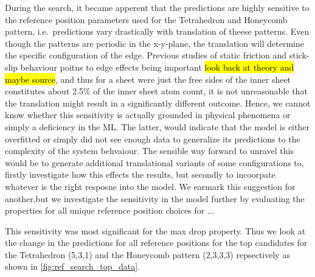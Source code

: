 During the search, it became apperent that the predictions are highly sensitive to the
reference position parameters used for the Tetrahedron and Honeycomb pattern, i.e.\ predictions vary drastically with translation of theese patterns. Even though the patterns are periodic in the x-y-plane, the translation will determine the specific configuration of the edge. Previous studies of static friction and stick-slip behaviour poitns to edge effects being important \hl{look back at theory and maybe source}, and thus for a sheet were just the free sides of the inner sheet constitutes about 2.5\% of the inner sheet atom count, it is not unreasonable that the translation might result in a significantly different outcome. Hence, we
cannot know whether this sensitivity is actually grounded in physical phenomena or simply a deficiency in the \acrshort{ML}. The latter, would indicate that the model is
either overfitted or simply did not see enough data to generalize its
predictions to the complexity of the system behvaiour. The sensible way forward to unravel this would be to generate additional translational variants of some configurations to,
firstly investigate how this effects the results, but secondly to incoorpate
whatever is the right resposne into the model. We earmark this suggestion for another,but we investigate the sensitivity in the model further by evaluating the properties for all unique reference position choices for ...


%
%
%
%


This sensitivity was most significant for the max drop property. Thus we look at the change in the predictions for all reference positions for the top candidates for the Tetrahedron (5,3,1) and the Honeycomb pattern (2,3,3,3) repsectively as shown in \cref{fig:ref_search_top_data}.


